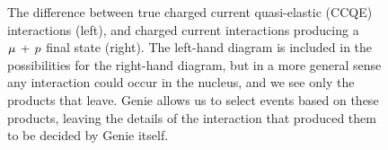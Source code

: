 \begin{figure}
\centering
{}
\caption[Charged current neutrino interactions producing a $\ccqe$ final state]{\label{fig:feynman-cc}The difference between true charged current quasi-elastic (CCQE) interactions (left), and charged current interactions producing a $\ccqe$ final state (right). The left-hand diagram is included in the possibilities for the right-hand diagram, but in a more general sense any interaction could occur in the nucleus, and we see only the products that leave. Genie allows us to select events based on these products, leaving the details of the interaction that produced them to be decided by Genie itself.}
\end{figure}
